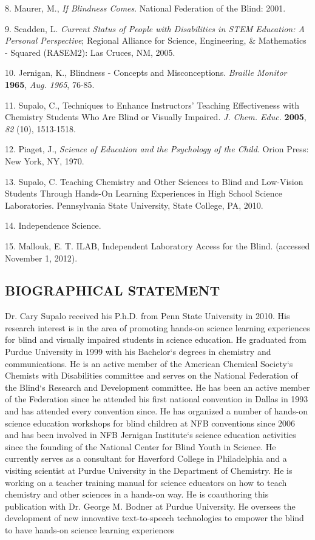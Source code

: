\documentclass[11.5pt]{sig-alternate} %
\begin{document}
8. Maurer, M., \textit{If Blindness Comes}. National Federation of the Blind: 2001.

9. Scadden, L. \textit{Current Status of People with Disabilities in STEM Education: A Personal Perspective}; Regional Alliance for Science, Engineering, \& Mathematics - Squared (RASEM2): Las Cruces, NM, 2005.

10. Jernigan, K., Blindness - Concepts and Misconceptions. \textit{Braille Monitor} \textbf{1965}, \textit{Aug. 1965}, 76-85.

11. Supalo, C., Techniques to Enhance Instructors’ Teaching Effectiveness with Chemistry Students Who Are Blind or Visually Impaired. \textit{J. Chem. Educ.} \textbf{2005}, \textit{82} (10), 1513-1518.

12. Piaget, J., \textit{Science of Education and the Psychology of the Child}. Orion Press: New York, NY, 1970.

13. Supalo, C. Teaching Chemistry and Other Sciences to Blind and Low-Vision Students Through Hands-On Learning Experiences in High School Science Laboratories. Pennsylvania State University, State College, PA, 2010.

14. Independence Science.

15. Mallouk, E. T. ILAB, Independent Laboratory Access for the Blind. (accessed November 1, 2012).
\clearpage
\begin{large}
\leftskip 0in
\parindent 0in 
\section*{BIOGRAPHICAL STATEMENT}

Dr. Cary Supalo received his P.h.D. from Penn State University in 2010. His research interest is in the area of promoting hands-on science learning experiences for blind and visually impaired students in science education. He graduated from Purdue University in 1999 with his Bachelor‘s degrees in chemistry and communications. He is an active member of the American Chemical Society‘s Chemists with Disabilities committee and serves on the National Federation of the Blind‘s Research and Development committee. He has been an active member of the Federation since he attended his first national convention in Dallas in 1993 and has attended every convention since. He has organized a number of hands-on science education workshops for blind children at NFB conventions since 2006 and has been involved in NFB Jernigan Institute‘s science education activities since the founding of the National Center for Blind Youth in Science. He currently serves as a consultant for Haverford College in Philadelphia and a visiting scientist at Purdue University in the Department of Chemistry. He is working on a teacher training manual for science educators on how to teach chemistry and other sciences in a hands-on way. He is coauthoring this publication with Dr. George M. Bodner at Purdue University. He oversees the development of new innovative text-to-speech technologies to empower the blind to have hands-on science learning experiences

\end{large}
\end{document}
